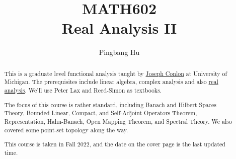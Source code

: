 \documentclass[a4paper]{report}
\author{Pingbang Hu}
\title{MATH602\\Real Analysis II}
\begin{document}
\maketitle

\begin{abstract}
	This is a graduate level functional analysis taught by \href{https://lsa.umich.edu/math/people/faculty/conlon.html}{Joseph Conlon} at University of Michigan. The prerequisites include linear algebra, complex analysis and also \href{https://pbb.wtf/posts/Notes#real-analysis-math597-umich}{real analysis}. We'll use Peter Lax\cite{lax2002functional} and Reed-Simon\cite{reed1980functional} as textbooks.

	The focus of this course is rather standard, including Banach and Hilbert Spaces Theory, Bounded Linear, Compact, and Self-Adjoint Operators Theorem, Representation, Hahn-Banach, Open Mapping Theorem, and Spectral Theory. We also covered some point-set topology along the way.

	\vfill
	This course is taken in Fall 2022, and the date on the cover page is the last updated time.
\end{abstract}

\tableofcontents


\newpage
\appendix
\appendixpage{}



\newpage
\printbibliography{}
\end{document}

